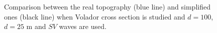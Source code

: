 \documentclass[11pt,letterpaper]{article}
\begin{document}
\begin{figure}[H]
	\centering
	\caption{Comparison between the real topography  (blue line) and simplified  ones (black line) when Volador cross section is studied and $d = 100$,   $d = 25$ m and $SV$ waves are used.}
	\label{fig:aplicageneral}
\end{figure}




\end{document}
